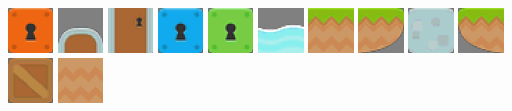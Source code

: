 \documentclass[10pt]{book}
\begin{document}
\begin{center}
\includegraphics[width=0.09\textwidth]{previews/kenney-TILES-08.png}
\includegraphics[width=0.09\textwidth]{previews/kenney-TILES-09.png}
\includegraphics[width=0.09\textwidth]{previews/kenney-TILES-10.png}
\includegraphics[width=0.09\textwidth]{previews/kenney-TILES-11.png}
\includegraphics[width=0.09\textwidth]{previews/kenney-TILES-12.png}
\includegraphics[width=0.09\textwidth]{previews/kenney-TILES-13.png}
\includegraphics[width=0.09\textwidth]{previews/kenney-TILES-14.png}
\includegraphics[width=0.09\textwidth]{previews/kenney-TILES-15.png}
\includegraphics[width=0.09\textwidth]{previews/kenney-TILES-16.png}
\includegraphics[width=0.09\textwidth]{previews/kenney-TILES-17.png}
\includegraphics[width=0.09\textwidth]{previews/kenney-TILES-18.png}
\includegraphics[width=0.09\textwidth]{previews/kenney-TILES-19.png}
\end{center}
\end{document}
